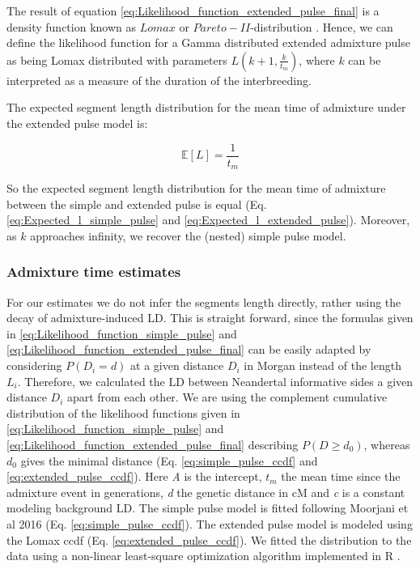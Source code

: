 \documentclass[]{article}
\begin{document}
The result of equation \ref{eq:Likelihood_function_extended_pulse_final} is a density function known as $Lomax$ or $Pareto-II$-distribution . Hence, we can define the likelihood function for a Gamma distributed extended admixture pulse as being Lomax distributed with parameters $L(k+1,\frac{k}{t_{m}})$, where $k$ can be interpreted as a measure of the duration of the interbreeding.

The expected segment length distribution for the mean time of admixture under the extended pulse model is:

\begin{equation}
\label{eq:Expected_l_extended_pulse}
\mathbb{E}[L] = \frac{1}{t_{m}}
\end{equation}

So the expected segment length distribution for the mean time of admixture between the simple and extended pulse is equal (Eq. \ref{eq:Expected_l_simple_pulse} and  \ref{eq:Expected_l_extended_pulse}). Moreover, as $k$ approaches infinity, we recover the (nested) simple pulse model.

\subsubsection{Admixture time estimates}\label{admixture time estimates}

For our estimates we do not infer the segments length directly, rather using the decay of admixture-induced LD. This is straight forward, since the formulas given in \ref{eq:Likelihood_function_simple_pulse} and \ref{eq:Likelihood_function_extended_pulse_final} can be easily adapted by considering $P(D_i=d)$ at a given distance $D_i$ in Morgan instead of the length $L_i$. Therefore, we calculated the LD between Neandertal informative sides a given distance $D_i$ apart from each other.
We are using the complement cumulative distribution of the likelihood functions given in \ref{eq:Likelihood_function_simple_pulse} and \ref{eq:Likelihood_function_extended_pulse_final} describing $P(D \geq d_0)$, whereas $d_0$ gives the minimal distance (Eq. \ref{eq:simple_pulse_ccdf} and \ref{eq:extended_pulse_ccdf}). Here \emph{A} is the
intercept, $t_m$ the mean time since the admixture event in generations,
\emph{d} the genetic distance in cM and \emph{c} is a constant modeling
background LD. The simple pulse model is fitted following Moorjani et al 2016
\citep{moorjani_genetic_2016} (Eq. \ref{eq:simple_pulse_ccdf}). The extended pulse model is
modeled using the Lomax ccdf (Eq. \ref{eq:extended_pulse_ccdf}).  We fitted the distribution to the data using a non-linear least-square optimization algorithm
implemented in R \citep{R_Core_Team_2019}.
\end{document}
